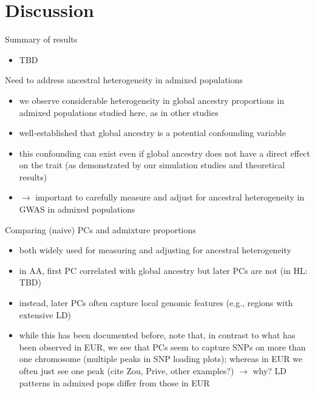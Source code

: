 \documentclass[12pt]{article}
\newcommand{\edit}[1]{{\color{red}{#1}}}
\begin{document}
\section{Discussion}


\edit{BORROW FROM DISSERTATION}

\noindent Summary of results
\begin{itemize}
\item TBD
\end{itemize}

\noindent Need to address ancestral heterogeneity in admixed populations
\begin{itemize}
\item we observe considerable heterogeneity in global ancestry proportions in admixed populations studied here, as in other studies 
\item well-established that global ancestry is a potential confounding variable
\item this confounding can exist even if global ancestry does not have a direct effect on the trait (as demonstrated by our simulation studies and theoretical results)
\item $\rightarrow$ important to carefully measure and adjust for ancestral heterogeneity in GWAS in admixed populations
\end{itemize}

\noindent Comparing (naive) PCs and admixture proportions
\begin{itemize}
\item both widely used for measuring and adjusting for ancestral heterogeneity
\item in AA, first PC correlated with global ancestry but later PCs are not (in HL: TBD)
\item instead, later PCs often capture local genomic features (e.g., regions with extensive LD)
\item while this has been documented before, note that, in contrast to what has been observed in EUR, we see that PCs seem to capture SNPs on more than one chromosome (multiple peaks in SNP loading plots); whereas in EUR we often just see one peak (cite Zou, Prive, other examples?) $\rightarrow$ why? LD patterns in admixed pops differ from those in EUR %
\end{itemize}
\end{document}
